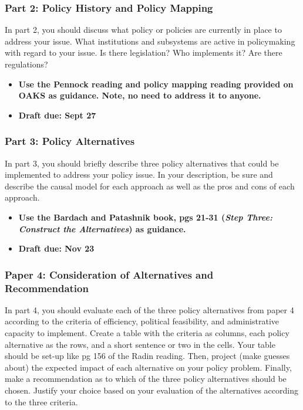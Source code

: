 \hypertarget{issue-paper-2-policy-history}{%
\subsubsection{Part 2: Policy
History and Policy Mapping}\label{issue-paper-2-policy-history}}

In part 2, you should discuss what policy or policies are
currently in place to address your issue. What institutions and
subsystems are active in policymaking with regard to your issue. Is
there legislation? Who implements it? Are there regulations?

\begin{itemize}
\item \textbf{Use the Pennock reading and policy mapping reading provided on OAKS as guidance. Note, no
need to address it to anyone.}

\item \textbf{Draft due: Sept 27}
\end{itemize}

\hypertarget{issue-paper-4-policy-alternatives}{%
\subsubsection{Part 3: Policy
Alternatives}\label{issue-paper-4-policy-alternatives}}

In part 3, you should briefly describe three policy alternatives
that could be implemented to address your policy issue. In your
description, be sure and describe the causal model for each approach as
well as the pros and cons of each approach.

\begin{itemize}
\item \textbf{Use the Bardach and Patashnik book, pgs 21-31 (\textit{Step Three: Construct the Alternatives}) as guidance.}

\item \textbf{Draft due: Nov 23}
\end{itemize}

\hypertarget{issue-paper-5-consideration-of-alternatives}{%
\subsubsection{Paper 4: Consideration of
Alternatives and Recommendation}\label{issue-paper-5-consideration-of-alternatives}}

In part 4, you should evaluate each of the three policy
alternatives from paper 4 according to the criteria of efficiency,
political feasibility, and administrative capacity to implement. Create a table with the criteria as columns, each policy alternative as the rows, and a short sentence or two in the cells. Your table should be set-up like pg 156 of the Radin reading. Then, project (make guesses about) the expected impact of each alternative on your policy problem. Finally, make a recommendation as to which of the three policy alternatives should be chosen. Justify your choice based on your evaluation of the alternatives according to the three criteria. 

